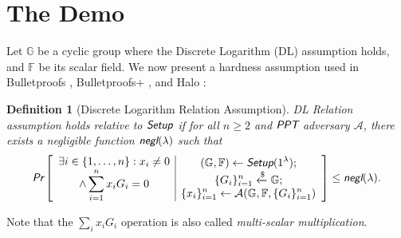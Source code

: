 \documentclass{article}
\newtheorem{definition}{Definition}[section]
\begin{document}
\section{The Demo}
Let $\mathbb{G}$ be a cyclic group where the Discrete Logarithm (DL) assumption holds, and $\mathbb{F}$ be its scalar field. We now present a hardness assumption used in Bulletproofs \cite{bp}, Bulletproofs+ \cite{bp-plus}, and Halo \cite{halo}:

\begin{definition}[Discrete Logarithm Relation Assumption]
	DL Relation assumption holds relative to $\emph{\textsf{Setup}}$ if for all $n \ge 2$ and  $\emph{\textsf{PPT}}$ adversary $\mathcal{A}$, there exists a negligible function $\emph{\textsf{negl}}(\lambda)$ such that
	\begin{align*}
		\emph{\textsf{Pr}}\left[
		\begin{array}{c|c}
			\begin{gathered}
				\exists i \in \{1, \ldots, n\}: x_i \ne 0 \\
				\wedge \sum_{i=1}^{n} x_i G_i = 0
			\end{gathered}
			&
			\begin{gathered}
				(\mathbb{G}, \mathbb{F})\leftarrow\emph{\textsf{Setup}}(1^{\lambda}); \\
				\{G_i\}_{i=1}^n \xleftarrow{\$}\mathbb{G}; \\
				\{x_i\}_{i=1}^n \leftarrow\mathcal{A}(\mathbb{G}, \mathbb{F}, \{G_i\}_{i=1}^n) \\
			\end{gathered}
		\end{array}
		\right]
		\le \emph{\textsf{negl}}(\lambda).
	\end{align*}
\end{definition}
\noindent Note that the $\sum_i x_i G_i$ operation is also called \textit{multi-scalar multiplication}.
\end{document}

